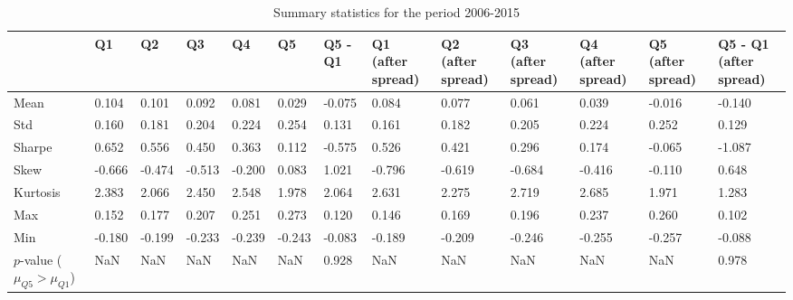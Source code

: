 \begin{table}
\caption{Summary statistics for the period 2006-2015}
\label{tab:summary_2006_2015}
\begin{tabular}{lllllllllllll}
\toprule
 & Q1 & Q2 & Q3 & Q4 & Q5 & Q5 - Q1 & Q1 (after spread) & Q2 (after spread) & Q3 (after spread) & Q4 (after spread) & Q5 (after spread) & Q5 - Q1 (after spread) \\
\midrule
Mean & 0.104 & 0.101 & 0.092 & 0.081 & 0.029 & -0.075 & 0.084 & 0.077 & 0.061 & 0.039 & -0.016 & -0.140 \\
Std & 0.160 & 0.181 & 0.204 & 0.224 & 0.254 & 0.131 & 0.161 & 0.182 & 0.205 & 0.224 & 0.252 & 0.129 \\
Sharpe & 0.652 & 0.556 & 0.450 & 0.363 & 0.112 & -0.575 & 0.526 & 0.421 & 0.296 & 0.174 & -0.065 & -1.087 \\
Skew & -0.666 & -0.474 & -0.513 & -0.200 & 0.083 & 1.021 & -0.796 & -0.619 & -0.684 & -0.416 & -0.110 & 0.648 \\
Kurtosis & 2.383 & 2.066 & 2.450 & 2.548 & 1.978 & 2.064 & 2.631 & 2.275 & 2.719 & 2.685 & 1.971 & 1.283 \\
Max & 0.152 & 0.177 & 0.207 & 0.251 & 0.273 & 0.120 & 0.146 & 0.169 & 0.196 & 0.237 & 0.260 & 0.102 \\
Min & -0.180 & -0.199 & -0.233 & -0.239 & -0.243 & -0.083 & -0.189 & -0.209 & -0.246 & -0.255 & -0.257 & -0.088 \\
$p$-value ($\mu_{Q5} > \mu_{Q1}$) & NaN & NaN & NaN & NaN & NaN & 0.928 & NaN & NaN & NaN & NaN & NaN & 0.978 \\
\bottomrule
\end{tabular}
\end{table}
